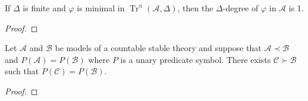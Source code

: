 \documentclass{article}
\DeclareMathOperator{\Tr}{Tr}
\let\mc\mathcal
\begin{document}
\begin{lemma}
    If $\Delta$ is finite and $\varphi$ is minimal in $\Tr^n(\mc{A}, \Delta)$, then the $\Delta$-degree of $\varphi$ in $\mc{A}$ is 1.
\end{lemma}
\begin{proof}
\end{proof}

\begin{theorem}
    Let $\mc{A}$ and $\mc{B}$ be models of a countable stable theory and suppose that $\mc{A} \prec \mc{B}$ and $P(\mc{A}) = P(\mc{B})$ where $P$ is a unary predicate symbol. There exists $\mc{C} \succ \mc{B}$ such that $P(\mc{C}) = P(\mc{B})$.
\end{theorem}
\begin{proof}
\end{proof}
\end{document}
